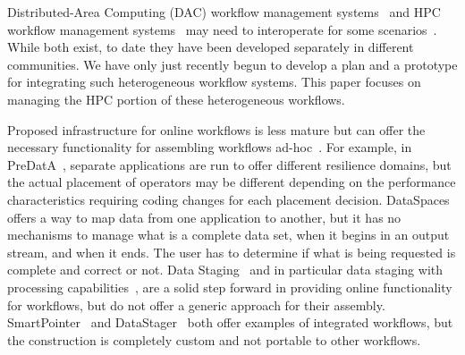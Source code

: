 \fi

Distributed-Area Computing
(DAC) workflow management
systems~\cite{tejedor:2015:pycompss,deelman:2015:pegasus} and HPC workflow
management systems~\cite{dorier:2015:in-situ-lessons} may need to interoperate
for some scenarios~\cite{deelman:2015:workflows-report}. While both exist, to
date they have been developed separately in different communities. We have only
just recently begun to develop a plan and a prototype for integrating such
heterogeneous workflow systems. This paper focuses on managing the HPC portion of
these heterogeneous workflows.
\fi




Proposed infrastructure for online workflows is less mature but can offer
the necessary functionality for assembling workflows
ad-hoc~\cite{zheng:2010:predata,docan:2010:dataspaces,wolf:2002:smartpointer,abbasi:2009:datastager}.
For example, in PreDatA~\cite{zheng:2010:predata}, separate applications are
run to offer different resilience domains, but the actual placement of
operators may be different depending on the performance characteristics requiring
coding changes for each placement decision.
DataSpaces~\cite{docan:2010:dataspaces} offers a way to map data from one
application to another, but it has no mechanisms to manage what is a complete
data set, when it begins in an output stream, and when it ends. The user has to
determine if what is being requested is complete and correct or not.
Data Staging~\cite{nisar:2008:staging} and in particular
data staging with processing
capabilities~\cite{abbasi:2009:datastager,ober:seismic}, are a solid step
forward in providing online functionality for workflows, but do not 
offer a generic approach for their assembly.
SmartPointer~\cite{wolf:2002:smartpointer} and
DataStager~\cite{abbasi:2009:datastager} both offer examples of integrated
workflows, but the construction is completely custom and not portable to other
workflows.

